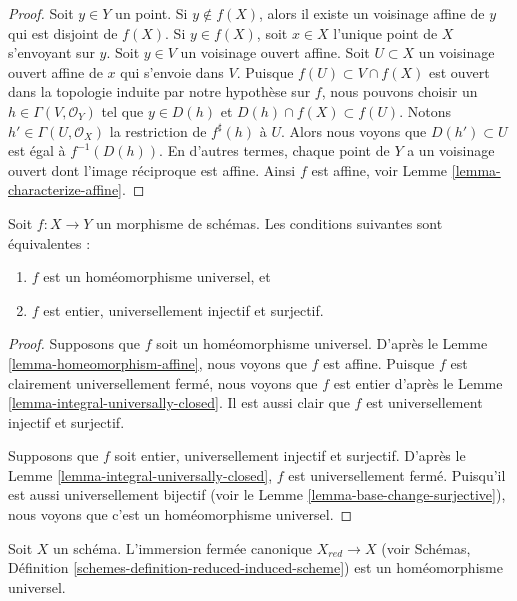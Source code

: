 \begin{proof}
Soit $y \in Y$ un point. Si $y \not \in f(X)$, alors il existe un voisinage
affine de $y$ qui est disjoint de $f(X)$.
Si $y \in f(X)$, soit $x \in X$ l'unique point de $X$ s'envoyant
sur $y$. Soit $y \in V$ un voisinage
ouvert affine. Soit $U \subset X$ un voisinage ouvert affine de $x$
qui s'envoie dans $V$. Puisque $f(U) \subset V \cap f(X)$ est ouvert dans la
topologie induite par notre hypothèse
sur $f$, nous pouvons choisir un $h \in \Gamma(V, \mathcal{O}_Y)$
tel que $y \in D(h)$ et $D(h) \cap f(X) \subset f(U)$. Notons $h' \in \Gamma(U, \mathcal{O}_X)$ la restriction
de $f^\sharp(h)$ à $U$. Alors nous voyons que $D(h') \subset U$
est égal à $f^{-1}(D(h))$. En d'autres termes, chaque point de $Y$
a un voisinage ouvert dont l'image réciproque est affine.
Ainsi $f$ est
affine, voir Lemme \ref{lemma-characterize-affine}.
\end{proof}

\begin{lemma}
\label{lemma-universal-homeomorphism}
Soit $f : X \to Y$ un morphisme de schémas. Les conditions suivantes sont équivalentes
:
\begin{enumerate}
\item $f$ est un homéomorphisme universel, et
\item $f$ est entier, universellement injectif et surjectif.
\end{enumerate}
\end{lemma}

\begin{proof}
Supposons que $f$ soit un homéomorphisme universel.
D'après le Lemme \ref{lemma-homeomorphism-affine}, nous
voyons que $f$ est affine. Puisque $f$ est clairement universellement
fermé, nous voyons que $f$
est entier d'après le Lemme \ref{lemma-integral-universally-closed}. Il
est aussi clair que $f$ est universellement injectif et surjectif.

\medskip\noindent
Supposons que $f$ soit entier, universellement injectif et
surjectif. D'après le Lemme \ref{lemma-integral-universally-closed}, $f$
est universellement fermé. Puisqu'il est aussi universellement bijectif
(voir le Lemme \ref{lemma-base-change-surjective}), nous voyons
que c'est un homéomorphisme universel.
\end{proof}

\begin{lemma}
\label{lemma-reduction-universal-homeomorphism}
Soit $X$ un schéma. L'immersion fermée canonique $X_{red} \to X$
(voir Schémas, Définition \ref{schemes-definition-reduced-induced-scheme}) est un homéomorphisme
universel.
\end{lemma}


